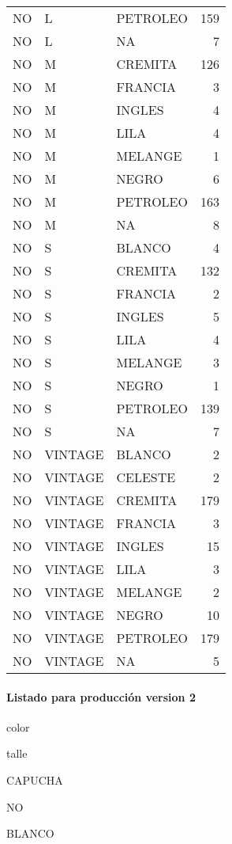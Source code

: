 \documentclass[
]{article}
\begin{document}
\begin{longtable}[t]{lllr}
NO & L & PETROLEO & 159\\
NO & L & NA & 7\\
NO & M & CREMITA & 126\\
NO & M & FRANCIA & 3\\
\addlinespace
NO & M & INGLES & 4\\
NO & M & LILA & 4\\
NO & M & MELANGE & 1\\
NO & M & NEGRO & 6\\
NO & M & PETROLEO & 163\\
\addlinespace
NO & M & NA & 8\\
NO & S & BLANCO & 4\\
NO & S & CREMITA & 132\\
NO & S & FRANCIA & 2\\
NO & S & INGLES & 5\\
\addlinespace
NO & S & LILA & 4\\
NO & S & MELANGE & 3\\
NO & S & NEGRO & 1\\
NO & S & PETROLEO & 139\\
NO & S & NA & 7\\
\addlinespace
NO & VINTAGE & BLANCO & 2\\
NO & VINTAGE & CELESTE & 2\\
NO & VINTAGE & CREMITA & 179\\
NO & VINTAGE & FRANCIA & 3\\
NO & VINTAGE & INGLES & 15\\
\addlinespace
NO & VINTAGE & LILA & 3\\
NO & VINTAGE & MELANGE & 2\\
NO & VINTAGE & NEGRO & 10\\
NO & VINTAGE & PETROLEO & 179\\
NO & VINTAGE & NA & 5\\
\bottomrule
\end{longtable}

\hypertarget{listado-para-producciuxf3n-version-2}{%
\paragraph{Listado para producción version
2}\label{listado-para-producciuxf3n-version-2}}

color

talle

CAPUCHA

NO

BLANCO
\end{document}
